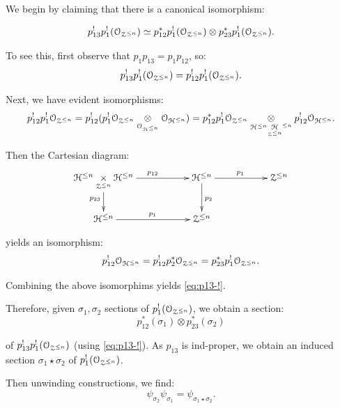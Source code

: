\documentclass[reqno,11pt]{amsart}
\numberwithin{equation}{subsection}
\theoremstyle{remark}
\newcommand{\sH}{{\EuScript H}}
\newcommand{\sO}{{\EuScript O}}
\newcommand{\sZ}{{\EuScript Z}}
\begin{document}
We begin by claiming that there is a canonical 
isomorphism: %

\begin{equation}\label{eq:p13-!}
p_{13}^!p_1^!(\sO_{\sZ^{\leq n}}) \simeq 
p_{12}^*p_1^!(\sO_{\sZ^{\leq n}}) \otimes 
p_{23}^*p_1^!(\sO_{\sZ^{\leq n}}). 
\end{equation}

\noindent To see this, first observe that
$p_1p_{13} = p_1p_{12}$, so:
%
\[
p_{13}^!p_1^!(\sO_{\sZ^{\leq n}}) = 
p_{12}^!p_1^!(\sO_{\sZ^{\leq n}}).
\]

Next, we have evident isomorphisms:
%
\[
\begin{gathered}
p_{12}^!p_1^! \sO_{\sZ^{\leq n}} = 
p_{12}^!(p_1^! \sO_{\sZ^{\leq n}}
\underset{\sO_{\sH^{\leq n}}}{\otimes} 
\sO_{\sH^{\leq n}}) = 
p_{12}^*p_1^! \sO_{\sZ^{\leq n}}
\underset{\sH^{\leq n} \underset{\sZ^{\leq n}} \sH^{\leq n} }
{\otimes} 
p_{12}^!\sO_{\sH^{\leq n}}.
\end{gathered}
\]

\noindent Then the Cartesian diagram:
%
\[
\xymatrix{
\sH^{\leq n} \underset{\sZ^{\leq n}}{\times} \sH^{\leq n} \ar[rr]^{p_{12}} 
\ar[d]_{p_{23}} && \sH^{\leq n} \ar[rr]^{p_1} \ar[d]^{p_2} && 
\sZ^{\leq n} \\
\sH^{\leq n} \ar[rr]^{p_1} && \sZ^{\leq n}
}
\]

\noindent yields an isomorphism: %
%
\[
p_{12}^!\sO_{\sH^{\leq n}} = 
p_{12}^!p_2^*\sO_{\sZ^{\leq n}} = 
p_{23}^*p_1^!\sO_{\sZ^{\leq n}}.
\]

\noindent Combining the above isomorphims yields \eqref{eq:p13-!}.

Therefore, given $\sigma_1, \sigma_2$ sections of
$p_1^!(\sO_{\sZ^{\leq n}})$, we obtain a section:
%
\[
p_{12}^*(\sigma_1) \otimes p_{23}^*(\sigma_2)
\]

\noindent of $p_{13}^!p_1^!(\sO_{\sZ^{\leq n}})$
(using \eqref{eq:p13-!}). As $p_{13}$ is ind-proper,
we obtain an induced section $\sigma_1 \star \sigma_2$ 
of $p_1^!(\sO_{\sZ^{\leq n}})$. 

Then unwinding constructions, we find:
%
\[
\psi_{\sigma_2} \psi_{\sigma_1} = \psi_{\sigma_1 \star \sigma_2}.
\]


\subsubsection{}\label{ss:h-embed}
\end{document}

